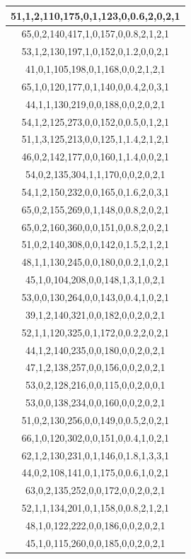 \documentclass{article}
\begin{document}
\begin{table}[h!]
\begin{tabular}{|c|}
51,1,2,110,175,0,1,123,0,0.6,2,0,2,1 \\ \hline
65,0,2,140,417,1,0,157,0,0.8,2,1,2,1 \\ \hline
53,1,2,130,197,1,0,152,0,1.2,0,0,2,1 \\ \hline
41,0,1,105,198,0,1,168,0,0,2,1,2,1 \\ \hline
65,1,0,120,177,0,1,140,0,0.4,2,0,3,1 \\ \hline
44,1,1,130,219,0,0,188,0,0,2,0,2,1 \\ \hline
54,1,2,125,273,0,0,152,0,0.5,0,1,2,1 \\ \hline
51,1,3,125,213,0,0,125,1,1.4,2,1,2,1 \\ \hline
46,0,2,142,177,0,0,160,1,1.4,0,0,2,1 \\ \hline
54,0,2,135,304,1,1,170,0,0,2,0,2,1 \\ \hline
54,1,2,150,232,0,0,165,0,1.6,2,0,3,1 \\ \hline
65,0,2,155,269,0,1,148,0,0.8,2,0,2,1 \\ \hline
65,0,2,160,360,0,0,151,0,0.8,2,0,2,1 \\ \hline
51,0,2,140,308,0,0,142,0,1.5,2,1,2,1 \\ \hline
48,1,1,130,245,0,0,180,0,0.2,1,0,2,1 \\ \hline
45,1,0,104,208,0,0,148,1,3,1,0,2,1 \\ \hline
53,0,0,130,264,0,0,143,0,0.4,1,0,2,1 \\ \hline
39,1,2,140,321,0,0,182,0,0,2,0,2,1 \\ \hline
52,1,1,120,325,0,1,172,0,0.2,2,0,2,1 \\ \hline
44,1,2,140,235,0,0,180,0,0,2,0,2,1 \\ \hline
47,1,2,138,257,0,0,156,0,0,2,0,2,1 \\ \hline
53,0,2,128,216,0,0,115,0,0,2,0,0,1 \\ \hline
53,0,0,138,234,0,0,160,0,0,2,0,2,1 \\ \hline
51,0,2,130,256,0,0,149,0,0.5,2,0,2,1 \\ \hline
66,1,0,120,302,0,0,151,0,0.4,1,0,2,1 \\ \hline
62,1,2,130,231,0,1,146,0,1.8,1,3,3,1 \\ \hline
44,0,2,108,141,0,1,175,0,0.6,1,0,2,1 \\ \hline
63,0,2,135,252,0,0,172,0,0,2,0,2,1 \\ \hline
52,1,1,134,201,0,1,158,0,0.8,2,1,2,1 \\ \hline
48,1,0,122,222,0,0,186,0,0,2,0,2,1 \\ \hline
45,1,0,115,260,0,0,185,0,0,2,0,2,1 \\ \hline

\end{tabular}
\end{table}
\end{document}
